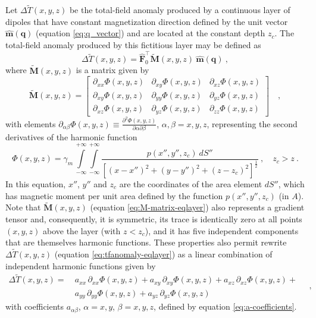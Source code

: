Let $\Delta \tilde{T}(x, y, z)$ be the total-field anomaly produced by a 
continuous layer of dipoles that have constant magnetization direction defined by
the unit vector $\hat{\mathbf{m}}(\mathbf{q})$ (equation \ref{eq:q_vector})
and are located at the constant depth $z_{c}$. The total-field anomaly produced
by this fictitious layer may be defined as
\begin{equation}
	\Delta \tilde{T}(x, y, z) = \hat{\mathbf{F}}_{0}^{\top} 
	\tilde{\mathbf{M}}(x, y, z) \: \hat{\mathbf{m}}(\mathbf{q}) \: ,
	\label{eq:tfanomaly-eqlayer}
\end{equation}
where $\tilde{\mathbf{M}}(x, y, z)$ is a matrix given by
\begin{equation}
	\tilde{\mathbf{M}}(x, y, z) = \begin{bmatrix}
		\partial_{xx} \Phi(x, y, z) & 
		\partial_{xy} \Phi(x, y, z) &
		\partial_{xz} \Phi(x, y, z) \\
		\partial_{xy} \Phi(x, y, z) & 
		\partial_{yy} \Phi(x, y, z) &
		\partial_{yz} \Phi(x, y, z) \\
		\partial_{xz} \Phi(x, y, z) & 
		\partial_{yz} \Phi(x, y, z) &
		\partial_{zz} \Phi(x, y, z)
	\end{bmatrix} \quad ,
	\label{eq:M-matrix-eqlayer}
\end{equation}
with elements
$\partial_{\alpha\beta} \Phi(x, y, z) \equiv 
\frac{\partial^{2} \Phi(x, y, z)}{\partial \alpha \partial \beta}$, 
$\alpha, \beta = x, y, z$, representing the second derivatives of the harmonic
function
\begin{equation}
	\Phi(x, y, z) = \gamma_{m} \, 
	\int\limits_{-\infty}^{+\infty}\int\limits_{-\infty}^{+\infty}
	\frac{p(x'', y'', z_{c}) \: dS''}
	{\left[ (x-x'')^2 + (y-y'')^2 + (z-z_{c})^2 \right]^{\frac{1}{2}}} \: ,
	\quad z_{c} > z \: .
	\label{eq:Phi-surface-integral}
\end{equation}
In this equation, $x''$, $y''$ and $z_{c}$ are the coordinates 
of the area element $dS''$, which has magnetic moment per unit area
defined by the function $p(x'', y'', z_{c})$ (in $A$).
Note that $\tilde{\mathbf{M}}(x, y, z)$ (equation \ref{eq:M-matrix-eqlayer}) also represents
a gradient tensor \citep{pedersen_rasmussen1990} and, consequently, it is symmetric, 
its trace is identically zero at all points $(x, y, z)$ above the layer (with $z < z_{c}$), 
and it has five independent components that are themselves harmonic functions.
These properties also permit rewrite $\Delta \tilde{T}(x, y, z)$ 
(equation \ref{eq:tfanomaly-eqlayer}) as a linear combination of independent
harmonic functions given by
\begin{equation}
	\begin{split}
		\Delta \tilde{T}(x, y, z) = \:
		& a_{xx} \, \partial_{xx} \Phi(x, y, z) + 
		a_{xy} \, \partial_{xy} \Phi(x, y, z) + 
		a_{xz} \, \partial_{xz} \Phi(x, y, z) + \\
		& a_{yy} \, \partial_{yy} \Phi(x, y, z) + 
		a_{yz} \, \partial_{yz} \Phi(x, y, z)
		\end{split} \quad ,
	\label{eq:tfanomaly-eqlayer-alternative}
\end{equation}
with coefficients $a_{\alpha\beta}$, $\alpha = x, y$, $\beta = x, y, z$, defined by
equation \ref{eq:a-coefficients}.

